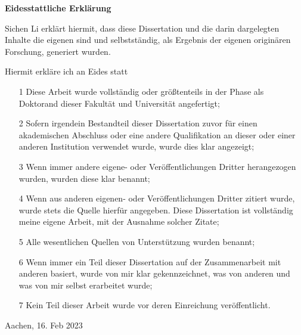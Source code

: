

\setcounter{page}{2}  %
\vspace*{1.5cm} %

\begin{huge}
  \begin{center}
      \textbf{Eidesstattliche Erkl{\"a}rung}
  \end{center}
\end{huge}

\vspace*{0.5cm}

\begin{large}

Sichen Li erkl{\"a}rt hiermit, dass diese Dissertation und die darin dargelegten Inhalte die eigenen sind und selbstst{\"a}ndig, als Ergebnis der eigenen origin{\"a}ren Forschung, generiert wurden.

Hiermit erkl{\"a}re ich an Eides statt
\begin{itemize}
\item[1]
Diese Arbeit wurde vollst{\"a}ndig oder gr{\"o}ßtenteils in der Phase als Doktorand dieser Fakult{\"a}t und Universit{\"a}t angefertigt; 
\item[2]
Sofern irgendein Bestandteil dieser Dissertation zuvor f{\"u}r einen akademischen Abschluss oder eine andere Qualifikation an dieser oder einer anderen Institution verwendet wurde, wurde dies klar angezeigt;
\item[3]
Wenn immer andere eigene- oder Ver{\"o}ffentlichungen Dritter herangezogen wurden, wurden diese klar benannt;
\item[4]
Wenn aus anderen eigenen- oder Ver{\"o}ffentlichungen Dritter zitiert wurde, wurde stets die Quelle hierf{\"u}r angegeben. Diese Dissertation ist vollst{\"a}ndig meine eigene Arbeit, mit der Ausnahme solcher Zitate;
\item[5]
Alle wesentlichen Quellen von Unterst{\"u}tzung wurden benannt;
\item[6]
Wenn immer ein Teil dieser Dissertation auf der Zusammenarbeit mit anderen basiert, wurde von mir klar gekennzeichnet, was von anderen und was von mir selbst erarbeitet wurde;
\item[7]
Kein Teil dieser Arbeit wurde vor deren Einreichung ver{\"o}ffentlicht.
\end{itemize}
\vspace*{0.5cm}
Aachen, 16. Feb 2023

\end{large}